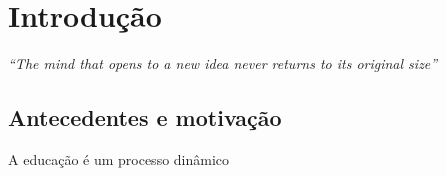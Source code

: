 \documentclass[Tese.tex]{subfiles}
\begin{document}
\chapter{Introdução}

\rightline
{\textit{``The mind that opens to a new idea never returns to its original size''}}


\section{Antecedentes e motivação}

A educação é um processo dinâmico 
\end{document}
